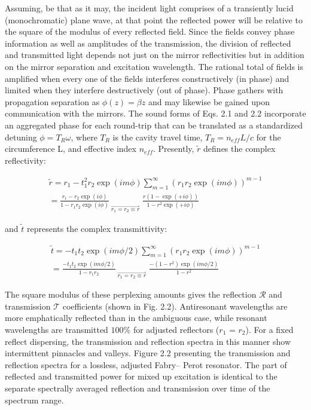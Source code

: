 Assuming, be that as it may, the incident light comprises of a transiently lucid (monochromatic) plane wave, at that point the reflected power will be relative to the square of the modulus of every reflected field. Since the fields convey phase information as well as amplitudes of the transmission, the division of reflected and transmitted light depends not just on the mirror reflectivities but in addition on the mirror separation and excitation wavelength. The rational total of fields is amplified when every one of the fields interferes constructively (in phase) and limited when they interfere destructively (out of phase). Phase gathers with propagation separation as $\phi(z) = \beta z$ and may likewise be gained upon communication with the mirrors. The sound forms of Eqs. 2.1 and 2.2 incorporate an aggregated phase for each round-trip that can be translated as a standardized detuning $\phi = T_{R}\omega$, where $T_{R}$ is the cavity travel time, $T_{R} = n_{eff}L/c$ for the circumference L, and effective index $n_{eff}$. Presently, $\tilde{r}$ defines the complex reflectivity: 

\begin{multline}
\tilde{r} = r_{1} - t_{1}^{2}r_{2}\exp(i m \phi) \sum_{m=1}^{\infty} (r_{1}r_{2}\exp(i m \phi))^{m-1} \\ = \frac{r_{1} - r_{2}\exp(i \phi)}{1 - r_{1}r_{2}\exp(i \phi)} _{\; \overrightarrow{r_{1} = r_{2} \equiv r}} \; \frac{r(1-\exp(+i \phi))}{1-r^{2}\exp(+i \phi)}
\end{multline}

and $\tilde{t}$ represents the complex transmittivity:

\begin{multline}
\tilde{t} = -t_{1}t_{2}\exp(i m \phi/2) \sum_{m=1}^{\infty} (r_{1}r_{2}\exp(i m \phi))^{m-1} \\ = \frac{-t_{1}t_{2}\exp(i m \phi/2)}{1 - r_{1}r_{2}} _{\; \overrightarrow{r_{1} = r_{2} \equiv r}} \; \frac{-(1-r^{2})\exp(im \phi/2)}{1-r^{2}}
\end{multline}


The square modulus of these perplexing amounts gives the reflection ${\mathcal R}$ and transmission ${\mathcal T}$ coefficients (shown in Fig. 2.2). Antiresonant wavelengths are more emphatically reflected than in the ambiguous case, while resonant wavelengths are transmitted $100\%$ for adjusted reflectors ($r_{1}$ = $r_{2}$). For a fixed reflect dispersing, the transmission and reflection spectra in this manner show intermittent pinnacles and valleys. Figure 2.2 presenting the transmission and reflection spectra for a lossless, adjusted Fabry– Perot resonator. The part of reflected and transmitted power for mixed up excitation is identical to the separate spectrally averaged reflection and transmission over time of the spectrum range.

